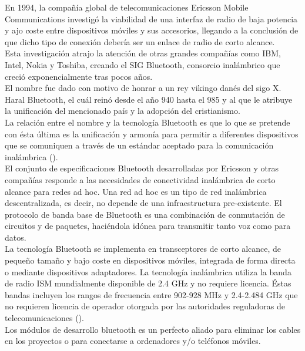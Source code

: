 En 1994, la compañía global de telecomunicaciones Ericsson Mobile Communications investigó la viabilidad de una interfaz de radio de baja potencia y ajo coste entre dispositivos móviles y sus accesorios, llegando a la conclusión de que dicho tipo de conexión debería ser un enlace de radio de corto alcance.\\

Esta investigación atrajo la atención de otras grandes compañías como IBM, Intel, Nokia y Toshiba, creando el SIG Bluetooth, consorcio inalámbrico que creció exponencialmente tras pocos años.\\

El nombre fue dado con motivo de honrar a un rey vikingo danés del sigo X. Haral Bluetooth, el cuál reinó desde el año 940 hasta el 985 y al que le atribuye la unificación del mencionado país y la adopción del cristianismo.\\
La relación entre el nombre y la tecnología Bluetooth es que lo que se pretende con ésta última es la unificación y armonía para permitir a diferentes dispositivos que se comuniquen a través de un estándar aceptado para la comunicación inalámbrica (\cite{MT-05}). \\

El conjunto de especificaciones Bluetooth desarrolladas por Ericsson y otras compañías responde a las necesidades de conectividad inalámbrica de corto alcance para redes ad hoc. Una red ad hoc es un tipo de red inalámbrica descentralizada, es decir, no depende de una infraestructura pre-existente. El protocolo de banda base de Bluetooth es una combinación de conmutación de circuitos y de paquetes, haciéndola idónea para transmitir tanto voz como para datos. \\

La tecnología Bluetooth se implementa en transceptores de corto alcance, de pequeño tamaño y bajo coste en dispositivos móviles, integrada de forma directa o mediante dispositivos adaptadores. La tecnología inalámbrica utiliza la banda de radio ISM mundialmente disponible de 2.4 GHz y no requiere licencia. Éstas bandas incluyen los rangos de frecuencia entre 902-928 MHz y 2.4-2.484 GHz que no requieren licencia de operador otorgada por las autoridades reguladoras de telecomunicaciones (\cite{MT-05}).\\

Los módulos de desarrollo bluetooth es un perfecto aliado para eliminar los cables en los proyectos o para conectarse a ordenadores y/o teléfonos móviles.\\

